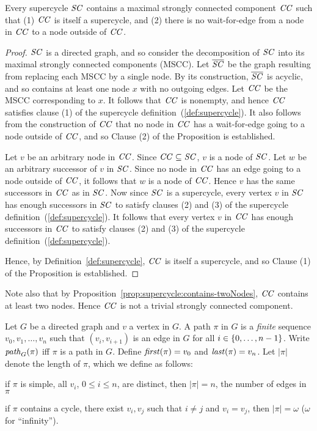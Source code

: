 \begin{proposition} \label{prop:supercycle:contains-mssc}
Every supercycle $\mathit{SC}$ contains a maximal strongly connected component $\mathit{CC}$
such that (1) $\mathit{CC}$ is itself a supercycle, and (2) there is no wait-for-edge from a node in $\mathit{CC}$ to a node outside of $\mathit{CC}$.
\end{proposition}
%
\begin{proof}
$\mathit{SC}$ is a directed graph, and so consider the decomposition of $\mathit{SC}$
into its maximal strongly connected components (MSCC). Let $\overline{\mathit{SC}}$ be the graph resulting
from replacing each MSCC by a single node. By its construction,  $\overline{\mathit{SC}}$ is acyclic, and so contains at least one
node $x$ with no outgoing edges. Let $\mathit{CC}$ be the MSCC corresponding to $x$. It follows that $\mathit{CC}$ is nonempty, and
hence $\mathit{CC}$ satisfies clause (1) of the supercycle definition~(\ref{def:supercycle}).
It also follows from the construction of $\mathit{CC}$ that no node in $\mathit{CC}$ has a wait-for-edge going to a node outside of
$\mathit{CC}$, and so Clause (2) of the Proposition is established.

Let $v$ be an arbitrary node in $\mathit{CC}$. Since $\mathit{CC} \subseteq \mathit{SC}$, $v$ is a node of $\mathit{SC}$. Let $w$ be an arbitrary successor of
$v$ in $\mathit{SC}$. Since no node in $\mathit{CC}$ has an edge going to a node outside of $\mathit{CC}$, it follows that $w$ is a node of $\mathit{CC}$.
Hence $v$ has the same successors in $\mathit{CC}$ as in $\mathit{SC}$. 
Now since $\mathit{SC}$ is a supercycle, every vertex $v$ in $\mathit{SC}$ has enough successors in $\mathit{SC}$ to satisfy clauses (2) and (3)
of the supercycle definition~(\ref{def:supercycle}). It follows that every vertex $v$ in $\mathit{CC}$ has enough successors in
$\mathit{CC}$ to satisfy clauses (2) and (3) of the supercycle definition~(\ref{def:supercycle}).  

Hence, by Definition~\ref{def:supercycle}, $\mathit{CC}$ is itself a supercycle, and so Clause (1) of the Proposition is established.
\end{proof}

Note also that by Proposition~\ref{prop:supercycle:contains-twoNodes}, $\mathit{CC}$ contains at least two nodes. Hence $\mathit{CC}$ is
not a trivial strongly connected component.






\begin{definition} \label{def:path} \label{defn:path}
Let $G$ be a directed graph and $v$ a vertex in $G$. A path $\pi$ in $G$ is a \emph{finite} sequence
$v_0, v_1, \ldots,v_n$ such that $(v_i, v_{i+1})$ is an edge in $G$ for all $i \in \{ 0,\ldots,n-1 \}$.
Write $\mathit{path}_{G}(\pi)$ iff $\pi$ is a path in $G$.
Define $\mathit{first}(\pi) = v_0$ and $\mathit{last}(\pi) = v_n$. 
%
Let $|\pi|$ denote the length of $\pi$, which we define as follows:
\be
\item if $\pi$ is simple, \ie all $v_i$, $0 \le i \le n$, are distinct, then $|\pi| = n$, \ie the
number of edges in $\pi$
\item if $\pi$ contains a cycle, \ie there exist $v_i, v_j$ such that $i \ne j$ and $v_i = v_j$, then
$|\pi| = \omega$ ($\omega$ for ``infinity'').
\ee
\end{definition}

